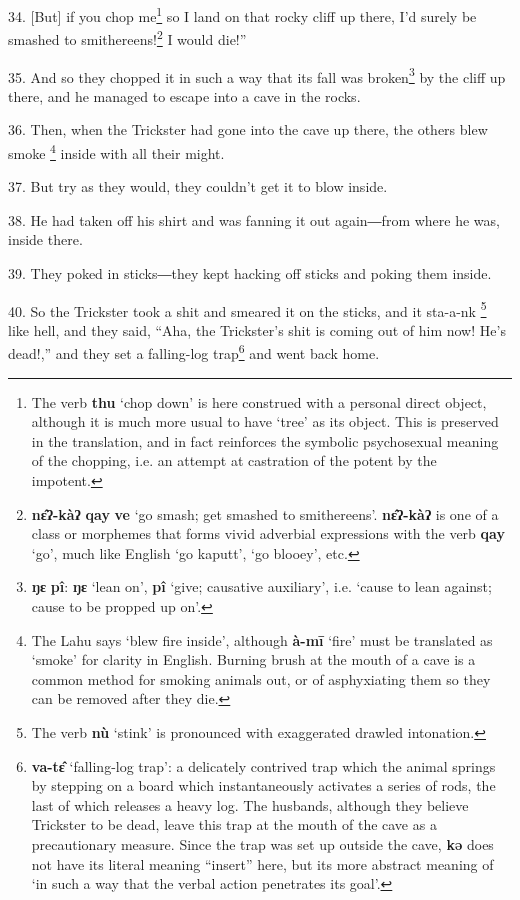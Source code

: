34. [But] if you chop me\footnote{The verb \textbf{thu} `chop down' is here construed with a personal direct object, although it is much more usual to have `tree' as its object. This is preserved in the translation, and in fact reinforces the symbolic psychosexual meaning of the chopping, i.e. an attempt at castration of the potent by the impotent.} so I land on that rocky cliff up there, I'd surely
be smashed to smithereens!\footnote{\textbf{nɛ̂ʔ-kàʔ} \textbf{qay} \textbf{ve} `go smash; get smashed to smithereens'. \textbf{nɛ̂ʔ-kàʔ} is one of a class or morphemes that forms vivid adverbial expressions with the verb \textbf{qay} `go', much like English `go kaputt', `go blooey', etc.} I would die!''

35. And so they chopped it in such a way that its fall was broken\footnote{\textbf{ŋɛ} \textbf{pî}: \textbf{ŋɛ} `lean on', \textbf{pî} `give; causative auxiliary', i.e. `cause to lean against; cause to be propped up on'.} by the cliff
up there, and he managed to escape into a cave in the rocks.

36. Then, when the Trickster had gone into the cave up there, the others blew smoke
\footnote{The Lahu says `blew fire inside', although \textbf{à-mī} `fire' must be translated as `smoke' for clarity in English. Burning brush at the mouth of a cave is a common method for smoking animals out, or of asphyxiating them so they can be removed after they die.} inside with all their might.

37. But try as they would, they couldn't get it to blow inside.

38. He had taken off his shirt and was fanning it out again―from where he was,
inside there.

39. They poked in sticks―they kept hacking off sticks and poking them inside.

40. So the Trickster took a shit and smeared it on the sticks, and it sta-a-nk
\footnote{The verb \textbf{nù} `stink' is pronounced with exaggerated drawled intonation.} like hell, and they said, ``Aha, the Trickster's shit is coming out of him
now! He's dead!,'' and they set a falling-log trap\footnote{\textbf{va-tɛ̂} `falling-log trap': a delicately contrived trap which the animal springs by stepping on a board which instantaneously activates a series of rods, the last of which releases a heavy log. The husbands, although they believe Trickster to be dead, leave this trap at the mouth of the cave as a precautionary measure. Since the trap was set up outside the cave, \textbf{kə} does not have its literal meaning ``insert'' here, but its more abstract meaning of `in such a way that the verbal action penetrates its goal'.} and went back home.

